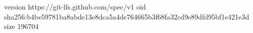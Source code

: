 version https://git-lfs.github.com/spec/v1
oid sha256:b4be59781ba8abde13e8dca5a4de764665b3f68fa32cd9e89dfd95bf1e421e3d
size 196704
